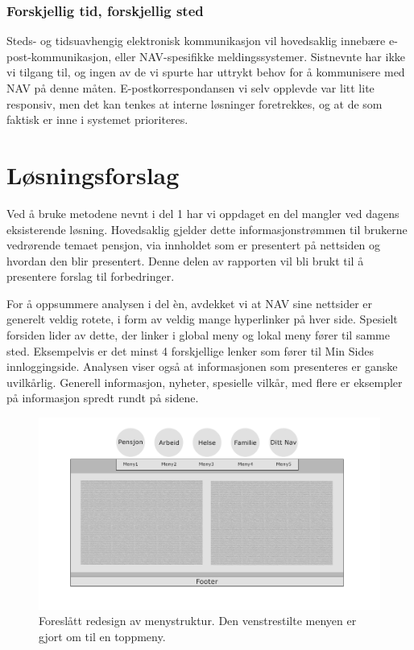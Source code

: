 \documentclass[informationsecurity]{gucmasterproject}
\begin{document}
\subsection{Forskjellig tid, forskjellig sted}
Steds- og tidsuavhengig elektronisk kommunikasjon vil hovedsaklig innebære e-post-kommunikasjon, eller NAV-spesifikke meldingssystemer. Sistnevnte har ikke vi tilgang til, og ingen av de vi spurte har uttrykt behov for å kommunisere med NAV på denne måten. E-postkorrespondansen vi selv opplevde var litt lite responsiv, men det kan tenkes at interne løsninger foretrekkes, og at de som faktisk er inne i systemet prioriteres.





\chapter{Løsningsforslag}
Ved å bruke metodene nevnt i del 1 har vi oppdaget en del mangler ved dagens eksisterende løsning. Hovedsaklig gjelder dette informasjonstrømmen til brukerne vedrørende temaet pensjon, via innholdet som er presentert på nettsiden og hvordan den blir presentert. Denne delen av rapporten vil bli brukt til å presentere forslag til forbedringer.

For å oppsummere analysen i del èn, avdekket vi at NAV sine nettsider er generelt veldig rotete, i form av veldig mange hyperlinker på hver side. Spesielt forsiden lider av dette, der linker i global meny og lokal meny fører til samme sted. Eksempelvis er det minst 4 forskjellige lenker som fører til Min Sides innloggingside. Analysen viser også at informasjonen som presenteres er ganske uvilkårlig. Generell informasjon, nyheter, spesielle vilkår, med flere er eksempler på informasjon spredt rundt på sidene.




\begin{figure}[h!]
	\centering
	\includegraphics[width=40em]{Skisse_1}
	\caption{Foreslått redesign av menystruktur. Den venstrestilte menyen er gjort om til en toppmeny.}
	\label{fig:skisse1}
\end{figure}
\end{document}
